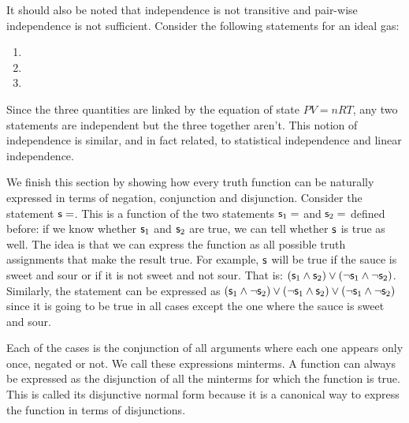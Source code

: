 \documentclass[11pt,letterpaper,fleqn]{memoir} %
\begin{document}
It should also be noted that independence is not transitive and pair-wise independence is not sufficient. Consider the following statements for an ideal gas:
\begin{enumerate}
	\item {}
	\item {}
	\item {}
\end{enumerate}
Since the three quantities are linked by the equation of state $PV=nRT$, any two statements are independent but the three together aren't. This notion of independence is similar, and in fact related, to statistical independence and linear independence.

We finish this section by showing how every truth function can be naturally expressed in terms of negation, conjunction and disjunction. Consider the statement $\mathsf{s}=$. This is a function of the two statements $\mathsf{s}_1=$ and $\mathsf{s}_2=$ defined before: if we know whether $\mathsf{s}_1$ and $\mathsf{s}_2$ are true, we can tell whether $\mathsf{s}$ is true as well. The idea is that we can express the function as all possible truth assignments that make the result true. For example, $\mathsf{s}$ will be true if the sauce is sweet and sour or if it is not sweet and not sour. That is: $(\mathsf{s}_1 \wedge \mathsf{s}_2) \vee (\neg \mathsf{s}_1 \wedge \neg \mathsf{s}_2)$. Similarly, the statement  can be expressed as $(\mathsf{s}_1 \wedge \neg \mathsf{s}_2) \vee (\neg \mathsf{s}_1 \wedge \mathsf{s}_2) \vee (\neg \mathsf{s}_1 \wedge \neg \mathsf{s}_2)$ since it is going to be true in all cases except the one where the sauce is sweet and sour.

Each of the cases is the conjunction of all arguments where each one appears only once, negated or not. We call these expressions minterms. A function can always be expressed as the disjunction of all the minterms for which the function is true. This is called its disjunctive normal form because it is a canonical way to express the function in terms of disjunctions.
\end{document}
